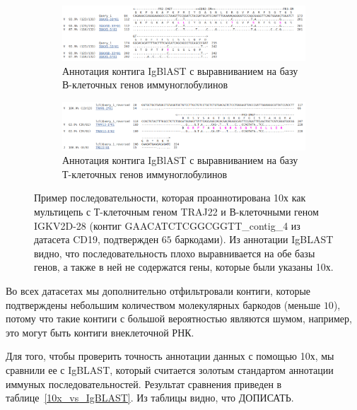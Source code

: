 \documentclass{spbau-diploma}
\begin{document}
\begin{figure}[h!]
  \centering
  \begin{subfigure}{\linewidth}
    \centering
    \includegraphics[width=1\textwidth]{figures/IgBLAST_bcr.png}
    \caption{Аннотация контига IgBlAST с выравниванием на базу В-клеточных генов иммуноглобулинов}
  \end{subfigure}

  \begin{subfigure}{\linewidth}
    \centering
    \includegraphics[width=1\textwidth]{figures/IgBLAST_tcr.png}
    \caption{Аннотация контига IgBlAST с выравниванием на базу Т-клеточных генов иммуноглобулинов}
  \end{subfigure}  
  \caption{Пример последовательности, которая проаннотирована 10х как мультицепь с Т-клеточным геном TRAJ22  и В-клеточными геном IGKV2D-28 (контиг GAACATCTCGGCGGTT\_contig\_4 из датасета CD19, подтвержден $65$ баркодами).
  Из аннотации IgBLAST видно, что последовательность плохо выравнивается на обе базы генов, а также в ней не содержатся гены, которые были указаны 10х.}

  \label{IgBLAST_multi}
\end{figure}  

Во всех датасетах мы дополнительно отфильтровали контиги, которые подтверждены небольшим количеством молекулярных баркодов (меньше $10$), потому что такие контиги с большой вероятностью являются шумом, например, это могут быть контиги внеклеточной РНК.

Для того, чтобы проверить точность аннотации данных с помощью 10х, мы сравнили ее с IgBLAST, который считается золотым стандартом аннотации иммуных последовательностей.
Результат сравнения приведен в таблице~\ref{10x_vs_IgBLAST}.
Из таблицы видно, что ДОПИСАТЬ.
\end{document}
